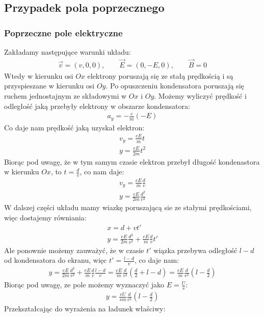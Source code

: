 \documentclass[paper=a4, fontsize=12pt]{scrartcl}
\begin{document}
\subsection{Przypadek pola poprzecznego}
\subsubsection{Poprzeczne pole elektryczne}
Zakładamy następujące warunki układu:
\begin{align*}
\vec{v}=(v,0,0),\qquad \vec{E}=(0,-E,0),\qquad\vec{B}=0
\end{align*}
Wtedy w kierunku osi $Ox$ elektrony poruszają się ze stałą prędkością i są przyspieszane w kierunku osi $Oy$. Po opuszczeniu kondensatora poruszają się ruchem jednostajnym ze składowymi w $Ox$ i $Oy$. Możemy wyliczyć prędkość i odległość jaką przebyły elektrony w obszarze kondensatora:
\begin{align*}
a_y=-\frac{e}{m}(-E)
\end{align*}
Co daje nam prędkość jaką uzyskał elektron:
\begin{align*}
v_y=\frac{eE}{m}t\\
y=\frac{eE}{2m}t^2
\end{align*}
Biorąc pod uwagę, że w tym samym czasie elektron przebył długość kondenastora w kierunku $Ox$, to $t=\frac{d}{v}$, co nam daje:
\begin{align*}
v_y=\frac{eE}{m}\frac{d}{v}\\
y=\frac{eE}{2m}\frac{d^2}{v^2}
\end{align*}
W dalszej części układu mamy wiazkę poruszającą sie ze stałymi prędkościami, więc dostajemy równiania:
\begin{align*}
x=d+vt'\\
y=\frac{eE}{2m}\frac{d^2}{v^2}+\frac{eE}{m}\frac{d}{v}t'
\end{align*}
Ale ponownie możemy zauważyć, że w czasie $t'$ wiązka przebywa odległość $l-d$ od kondensatora do ekranu, więc $t'=\frac{l-d}{v}$, co daje nam:
\begin{align*}
y=\frac{eE}{2m}\frac{d^2}{v^2}+\frac{eE}{m}\frac{d}{v}\frac{l-d}{v}=\frac{eE}{m}\frac{d}{v^2}\left(\frac{d}{2}+l-d\right)=
\frac{eE}{m}\frac{d}{v^2}\left(l-\frac{d}{2}\right)
\end{align*}
Biorąc pod uwagę, ze pole możemy wyznaczyć jako $E=\frac{U}{s}$:
\begin{align*}
y=\frac{eU}{sm}\frac{d}{v^2}\left(l-\frac{d}{2}\right)
\end{align*}
Przekształcając do wyrażenia na ładunek właściwy:
\end{document}
